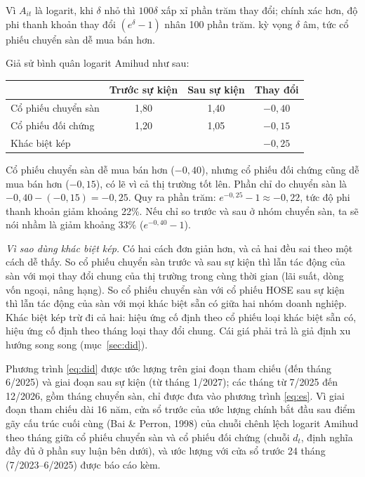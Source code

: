 Vì $A_{it}$ là logarit, khi $\delta$ nhỏ thì $100\delta$ xấp xỉ phần trăm thay đổi; chính xác hơn, độ phi thanh khoản thay đổi $(e^{\delta} - 1)$ nhân 100 phần trăm.  kỳ vọng $\delta$ âm, tức cổ phiếu chuyển sàn dễ mua bán hơn.

\begin{vidu}
Giả sử bình quân logarit Amihud như sau:
\begin{center}
\begin{tabular}{@{}lccc@{}}
\toprule
 & Trước sự kiện & Sau sự kiện & Thay đổi\\
\midrule
Cổ phiếu chuyển sàn & 1,80 & 1,40 & $-0{,}40$\\
Cổ phiếu đối chứng & 1,20 & 1,05 & $-0{,}15$\\
\midrule
Khác biệt kép & & & $-0{,}25$\\
\bottomrule
\end{tabular}
\end{center}
Cổ phiếu chuyển sàn dễ mua bán hơn ($-0{,}40$), nhưng cổ phiếu đối chứng cũng dễ mua bán hơn ($-0{,}15$), có lẽ vì cả thị trường tốt lên. Phần chỉ do chuyển sàn là $-0{,}40 - (-0{,}15) = -0{,}25$. Quy ra phần trăm: $e^{-0{,}25} - 1 \approx -0{,}22$, tức độ phi thanh khoản giảm khoảng 22\%. Nếu chỉ so trước và sau ở nhóm chuyển sàn, ta sẽ nói nhầm là giảm khoảng 33\% ($e^{-0{,}40} - 1$).
\end{vidu}

\begin{vidao}
\emph{Vì sao dùng khác biệt kép.} Có hai cách đơn giản hơn, và cả hai đều sai theo một cách dễ thấy. So cổ phiếu chuyển sàn trước và sau sự kiện thì lẫn tác động của sàn với mọi thay đổi chung của thị trường trong cùng thời gian (lãi suất, dòng vốn ngoại, nâng hạng). So cổ phiếu chuyển sàn với cổ phiếu HOSE sau sự kiện thì lẫn tác động của sàn với mọi khác biệt sẵn có giữa hai nhóm doanh nghiệp. Khác biệt kép trừ đi cả hai: hiệu ứng cố định theo cổ phiếu loại khác biệt sẵn có, hiệu ứng cố định theo tháng loại thay đổi chung. Cái giá phải trả là giả định xu hướng song song (mục~\ref{sec:did}).
\end{vidao}

Phương trình \eqref{eq:did} được ước lượng trên giai đoạn tham chiếu (đến tháng 6/2025) và giai đoạn sau sự kiện (từ tháng 1/2027); các tháng từ 7/2025 đến 12/2026, gồm tháng chuyển sàn, chỉ được đưa vào phương trình \eqref{eq:es}. Vì giai đoạn tham chiếu dài 16 năm, cửa sổ trước của ước lượng chính bắt đầu sau điểm gãy cấu trúc cuối cùng (Bai \& Perron, 1998) của chuỗi chênh lệch logarit Amihud theo tháng giữa cổ phiếu chuyển sàn và cổ phiếu đối chứng (chuỗi $d_t$, định nghĩa đầy đủ ở phần suy luận bên dưới), và ước lượng với cửa sổ trước 24 tháng (7/2023--6/2025) được báo cáo kèm.

